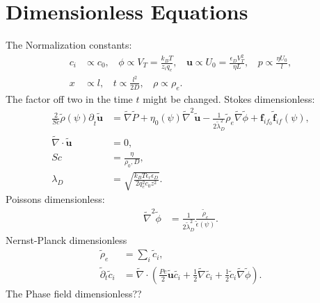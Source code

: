 \documentclass[a4paper,10pt]{article}
\numberwithin{equation}{section}
\numberwithin{figure}{section}
\begin{document}
\section{Dimensionless Equations} 
The Normalization constants:
\begin{align}
c_i &\propto c_0, ~~~~ \phi \propto V_T = \frac{k_B T}{z_i q_e}, ~~~~\mathbf{u} \propto U_0 = \frac{\epsilon_D V_T^2}{\eta L}, ~~~~p \propto \frac{\eta U_0}{l},\\
x &\propto l, ~~~~ t \propto \frac{l^2}{2 D}, ~~~~ \rho \propto \rho_e.
\end{align}
The factor off two in the time $t$ might be changed. \newline
Stokes dimensionless:
\begin{align}
\frac{2}{Sc}\tilde{\rho}(\psi) \partial_{\tilde{t}} \tilde{\mathbf{u}}  &=  \tilde{\nabla} \tilde{P} + \eta_0(\psi)\tilde{\nabla}^2 \tilde{\mathbf{u}} - \frac{1}{2\tilde{\lambda}^2_D} \tilde{\rho}_e  \tilde{\nabla} \tilde{\phi} + \mathbf{f}_{if_0} \tilde{\mathbf{f}}_{if}(\psi), \\
\tilde{\nabla }\cdot\tilde{\mathbf{u}} &= 0, \\
Sc &= \frac{\eta}{\rho_0,D}, \\
\lambda_D &= \sqrt{\frac{k_B T \epsilon_r \epsilon_D}{2 q_e^2 c_0 z^2}}.  
\end{align}
Poissons dimensionless: 
\begin{align}
\tilde{\nabla}^2\tilde{\phi}&= \frac{1}{2\tilde{\lambda}_D^2 }\frac{\tilde{\rho}_e}{\tilde{\epsilon}(\psi)}.
\end{align}
Nernst-Planck dimensionless
\begin{align}
\tilde{\rho}_e &= \sum_i \tilde{c}_i, \\
\tilde{\partial}_t\tilde{c}_i &= \tilde{\nabla}\cdot\left(\frac{Pe}{2}\tilde{\mathbf{u}}\tilde{c_i}+\frac{1}{2}\tilde{\nabla}\tilde{c_i}+\frac{1}{2}\tilde{c}_i\tilde{\nabla}\tilde{\phi}\right).
\end{align}
The Phase field dimensionless??
\end{document}
